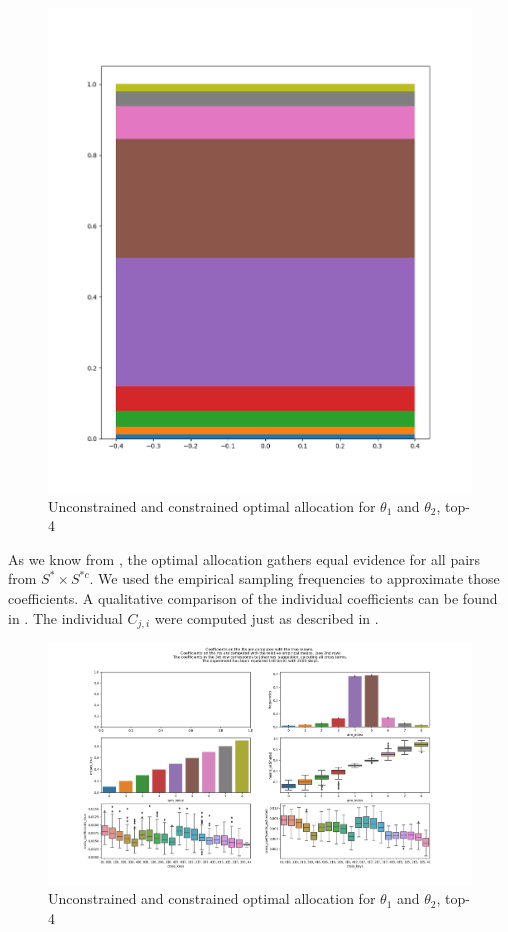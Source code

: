 \begin{figure}[h]
  \centering
  \includegraphics[width=\textwidth]{190723-selections_2.png}
  \caption{Unconstrained and constrained optimal allocation for $\theta_1$ and
  $\theta_2$, top-4}
  \label{fig:measurement_plan}
\end{figure}
As we know from , the optimal allocation
gathers equal evidence for all pairs from $S^* \times S^{*c}$. We used the
empirical sampling frequencies to approximate those coefficients. A qualitative
comparison of the individual coefficients can be found in
. The individual $C_{j, i}$ were computed just
as described in .
\begin{figure}[h]
  \centering
  \includegraphics[width=\textwidth]{190909-coefficients_2000.png}
  \caption{Unconstrained and constrained optimal allocation for $\theta_1$ and
  $\theta_2$, top-4}
  \label{fig:algorithm_coefficients}
\end{figure}

